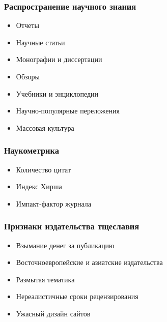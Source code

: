 \documentclass[aspectratio=169]{beamer}
\begin{document}
\begin{frame}\frametitle{Распространение научного знания}
\begin{itemize}
\item<+-> Отчеты
\item<+-> Научные статьи
\end{itemize}
\begin{itemize}
\item<+-> Монографии и диссертации
\item<+-> Обзоры
\item<+-> Учебники и энциклопедии
\end{itemize}
\begin{itemize}
\item<+-> Научно-популярные переложения
\item<+-> Массовая культура
\end{itemize}
\end{frame}

\begin{bframe}\frametitle{Наукометрика}
\begin{itemize}
\item Количество цитат
\item Индекс Хирша
\item Импакт-фактор журнала
\end{itemize}
\end{bframe}


\begin{bframe}\frametitle{Признаки издательства тщеславия}
\begin{itemize}
\item<+-> Взымание денег за публикацию
\item<+-> Восточноевропейские и азиатские издательства
\item<+-> Размытая тематика
\item<+-> Нереалистичные сроки рецензирования
\item<+-> Ужасный дизайн сайтов
\end{itemize}
\end{bframe}
\end{document}
